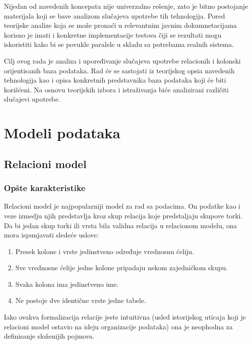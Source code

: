 \documentclass[12pt,oneside]{memoir}
\begin{document}
Nijedan od navedenih koncepata nije univerzalno rešenje, zato je bitno postojanje materijala koji se bave analizom slučajeva upotrebe tih tehnologija. Pored teorijske analize koja se može pronaći u relevantnim javnim dokumnetacijama korisno je imati i konkretne implementacije testova čiji se rezultati mogu iskoristiti kako bi se povukle paralele u skladu sa potrebama realnih  sistema. 

Cilj ovog rada je analiza i upoređivanje slučajeva upotrebe relacionih i kolonski orijentisanih baza podataka. Rad će se sastojati iz teorijskog opsia navedenih tehnologija kao i opisa konkretnih predstavnika baza podataka koji će biti korišćeni. Na osnovu teorijskih izbora i istraživanja biće analizirani različiti slučajevi upotrebe. 


\chapter{Modeli podataka}
\label{chp:razrada}
\section{Relacioni model}
\subsection{Opšte karakteristike}
Relacioni model je najpopularniji model za rad sa podacima. On podatke kao i veze izmedju njih predstavlja kroz skup relacija koje predstaljaju skupove torki. Da bi jedan skup torki ili vrsta bila validna relacija u relacionom modelu, ona mora ispunjavati sledeće uslove:

\begin{enumerate}
\item[\textbullet] Presek kolone i vrste jedinstveno određuje vrednosnu ćeliju.

\item[\textbullet] Sve vrednosne ćelije jedne kolone pripadaju nekom zajedničkom skupu. 

\item[\textbullet] Svaka kolona ima jedinstveno ime.

\item[\textbullet] Ne postoje dve identične vrste jedne tabele. 
\end{enumerate}

Iako ovakva formalizacija relacije jeste intuitivna (usled istorijskog uticaja koji je relacioni model ostavio na ideju organizacije podataka) ona je neophodna za  definisanje složenijih pojmova. 
\end{document}
